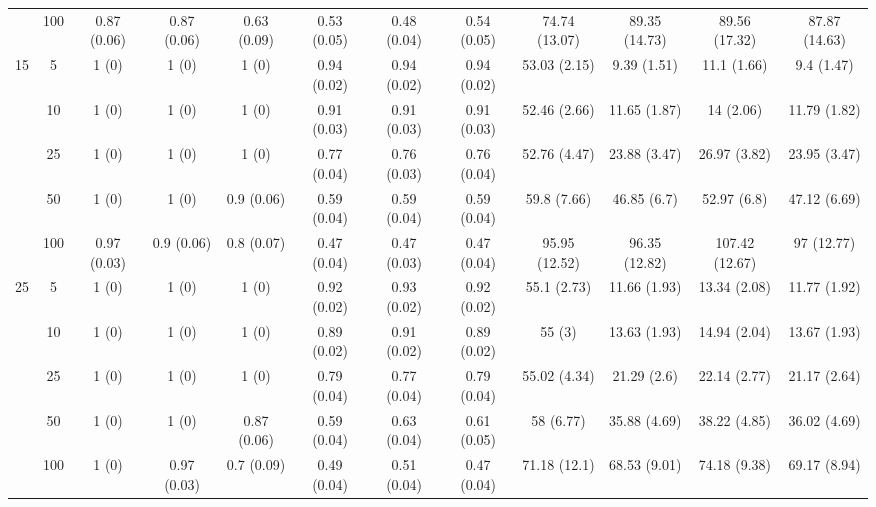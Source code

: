 \documentclass[11pt]{article}
\theoremstyle{definition}
\begin{document}
\begin{table}[H]
\begin{center}
{\begin{tabular}{cc|ccc|ccc|cccc|}
    & 100  & 0.87 (0.06) & 0.87 (0.06) & 0.63 (0.09) & 0.53 (0.05) & 0.48 (0.04) & 0.54 (0.05) & 74.74 (13.07) & 89.35 (14.73) & 89.56 (17.32) & 87.87 (14.63) \\[.3cm]
   \multirow{5}{*}{15}  & 5  & 1 (0) & 1 (0) & 1 (0) & 0.94 (0.02) & 0.94 (0.02) & 0.94 (0.02) & 53.03 (2.15) & 9.39 (1.51) & 11.1 (1.66) & 9.4 (1.47) \\ 
    & 10  & 1 (0) & 1 (0) & 1 (0) & 0.91 (0.03) & 0.91 (0.03) & 0.91 (0.03) & 52.46 (2.66) & 11.65 (1.87) & 14 (2.06) & 11.79 (1.82) \\ 
    & 25  & 1 (0) & 1 (0) & 1 (0) & 0.77 (0.04) & 0.76 (0.03) & 0.76 (0.04) & 52.76 (4.47) & 23.88 (3.47) & 26.97 (3.82) & 23.95 (3.47) \\ 
    & 50  & 1 (0) & 1 (0) & 0.9 (0.06) & 0.59 (0.04) & 0.59 (0.04) & 0.59 (0.04) & 59.8 (7.66) & 46.85 (6.7) & 52.97 (6.8) & 47.12 (6.69) \\ 
    & 100  & 0.97 (0.03) & 0.9 (0.06) & 0.8 (0.07) & 0.47 (0.04) & 0.47 (0.03) & 0.47 (0.04) & 95.95 (12.52) & 96.35 (12.82) & 107.42 (12.67) & 97 (12.77) \\[.3cm]
   \multirow{5}{*}{25}  & 5  & 1 (0) & 1 (0) & 1 (0) & 0.92 (0.02) & 0.93 (0.02) & 0.92 (0.02) & 55.1 (2.73) & 11.66 (1.93) & 13.34 (2.08) & 11.77 (1.92) \\ 
    & 10  & 1 (0) & 1 (0) & 1 (0) & 0.89 (0.02) & 0.91 (0.02) & 0.89 (0.02) & 55 (3) & 13.63 (1.93) & 14.94 (2.04) & 13.67 (1.93) \\ 
    & 25  & 1 (0) & 1 (0) & 1 (0) & 0.79 (0.04) & 0.77 (0.04) & 0.79 (0.04) & 55.02 (4.34) & 21.29 (2.6) & 22.14 (2.77) & 21.17 (2.64) \\ 
   & 50  & 1 (0) & 1 (0) & 0.87 (0.06) & 0.59 (0.04) & 0.63 (0.04) & 0.61 (0.05) & 58 (6.77) & 35.88 (4.69) & 38.22 (4.85) & 36.02 (4.69) \\ 
    & 100  & 1 (0) & 0.97 (0.03) & 0.7 (0.09) & 0.49 (0.04) & 0.51 (0.04) & 0.47 (0.04) & 71.18 (12.1) & 68.53 (9.01) & 74.18 (9.38) & 69.17 (8.94) \\ 
\end{tabular}}
   \end{center}
      \vspace{-.5cm}
\end{table}
\end{document}
